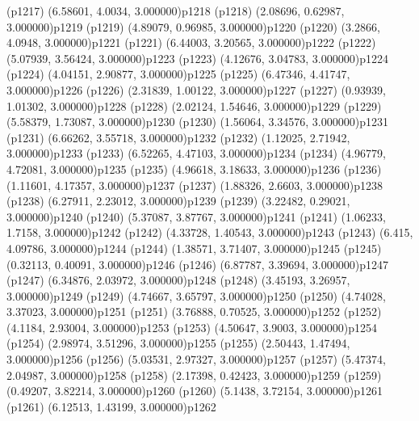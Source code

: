 \psdot(p1217)
\psPoint(6.58601, 4.0034, 3.000000){p1218}
\psdot(p1218)
\psPoint(2.08696, 0.62987, 3.000000){p1219}
\psdot(p1219)
\psPoint(4.89079, 0.96985, 3.000000){p1220}
\psdot(p1220)
\psPoint(3.2866, 4.0948, 3.000000){p1221}
\psdot(p1221)
\psPoint(6.44003, 3.20565, 3.000000){p1222}
\psdot(p1222)
\psPoint(5.07939, 3.56424, 3.000000){p1223}
\psdot(p1223)
\psPoint(4.12676, 3.04783, 3.000000){p1224}
\psdot(p1224)
\psPoint(4.04151, 2.90877, 3.000000){p1225}
\psdot(p1225)
\psPoint(6.47346, 4.41747, 3.000000){p1226}
\psdot(p1226)
\psPoint(2.31839, 1.00122, 3.000000){p1227}
\psdot(p1227)
\psPoint(0.93939, 1.01302, 3.000000){p1228}
\psdot(p1228)
\psPoint(2.02124, 1.54646, 3.000000){p1229}
\psdot(p1229)
\psPoint(5.58379, 1.73087, 3.000000){p1230}
\psdot(p1230)
\psPoint(1.56064, 3.34576, 3.000000){p1231}
\psdot(p1231)
\psPoint(6.66262, 3.55718, 3.000000){p1232}
\psdot(p1232)
\psPoint(1.12025, 2.71942, 3.000000){p1233}
\psdot(p1233)
\psPoint(6.52265, 4.47103, 3.000000){p1234}
\psdot(p1234)
\psPoint(4.96779, 4.72081, 3.000000){p1235}
\psdot(p1235)
\psPoint(4.96618, 3.18633, 3.000000){p1236}
\psdot(p1236)
\psPoint(1.11601, 4.17357, 3.000000){p1237}
\psdot(p1237)
\psPoint(1.88326, 2.6603, 3.000000){p1238}
\psdot(p1238)
\psPoint(6.27911, 2.23012, 3.000000){p1239}
\psdot(p1239)
\psPoint(3.22482, 0.29021, 3.000000){p1240}
\psdot(p1240)
\psPoint(5.37087, 3.87767, 3.000000){p1241}
\psdot(p1241)
\psPoint(1.06233, 1.7158, 3.000000){p1242}
\psdot(p1242)
\psPoint(4.33728, 1.40543, 3.000000){p1243}
\psdot(p1243)
\psPoint(6.415, 4.09786, 3.000000){p1244}
\psdot(p1244)
\psPoint(1.38571, 3.71407, 3.000000){p1245}
\psdot(p1245)
\psPoint(0.32113, 0.40091, 3.000000){p1246}
\psdot(p1246)
\psPoint(6.87787, 3.39694, 3.000000){p1247}
\psdot(p1247)
\psPoint(6.34876, 2.03972, 3.000000){p1248}
\psdot(p1248)
\psPoint(3.45193, 3.26957, 3.000000){p1249}
\psdot(p1249)
\psPoint(4.74667, 3.65797, 3.000000){p1250}
\psdot(p1250)
\psPoint(4.74028, 3.37023, 3.000000){p1251}
\psdot(p1251)
\psPoint(3.76888, 0.70525, 3.000000){p1252}
\psdot(p1252)
\psPoint(4.1184, 2.93004, 3.000000){p1253}
\psdot(p1253)
\psPoint(4.50647, 3.9003, 3.000000){p1254}
\psdot(p1254)
\psPoint(2.98974, 3.51296, 3.000000){p1255}
\psdot(p1255)
\psPoint(2.50443, 1.47494, 3.000000){p1256}
\psdot(p1256)
\psPoint(5.03531, 2.97327, 3.000000){p1257}
\psdot(p1257)
\psPoint(5.47374, 2.04987, 3.000000){p1258}
\psdot(p1258)
\psPoint(2.17398, 0.42423, 3.000000){p1259}
\psdot(p1259)
\psPoint(0.49207, 3.82214, 3.000000){p1260}
\psdot(p1260)
\psPoint(5.1438, 3.72154, 3.000000){p1261}
\psdot(p1261)
\psPoint(6.12513, 1.43199, 3.000000){p1262}
